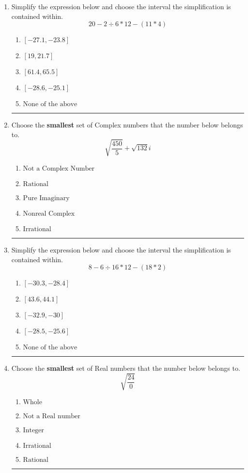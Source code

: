 \documentclass[14pt]{extbook}
\newcommand{\litem}[1]{\item#1\hspace*{-1cm}\rule{\textwidth}{0.4pt}}
\begin{document}
\begin{enumerate}
{\begin{enumerate}[label=\Alph*.]
\end{enumerate} }
\litem{
Simplify the expression below and choose the interval the simplification is contained within.\[ 20 - 2 \div 6 * 12 - (11 * 4) \]\begin{enumerate}[label=\Alph*.]
\item \( [-27.1, -23.8] \)
\item \( [19, 21.7] \)
\item \( [61.4, 65.5] \)
\item \( [-28.6, -25.1] \)
\item \( \text{None of the above} \)

\end{enumerate} }
\litem{
Choose the \textbf{smallest} set of Complex numbers that the number below belongs to.\[ \sqrt{\frac{450}{5}}+\sqrt{132} i \]\begin{enumerate}[label=\Alph*.]
\item \( \text{Not a Complex Number} \)
\item \( \text{Rational} \)
\item \( \text{Pure Imaginary} \)
\item \( \text{Nonreal Complex} \)
\item \( \text{Irrational} \)

\end{enumerate} }
\litem{
Simplify the expression below and choose the interval the simplification is contained within.\[ 8 - 6 \div 16 * 12 - (18 * 2) \]\begin{enumerate}[label=\Alph*.]
\item \( [-30.3, -28.4] \)
\item \( [43.6, 44.1] \)
\item \( [-32.9, -30] \)
\item \( [-28.5, -25.6] \)
\item \( \text{None of the above} \)

\end{enumerate} }
\litem{
Choose the \textbf{smallest} set of Real numbers that the number below belongs to.\[ \sqrt{\frac{24}{0}} \]\begin{enumerate}[label=\Alph*.]
\item \( \text{Whole} \)
\item \( \text{Not a Real number} \)
\item \( \text{Integer} \)
\item \( \text{Irrational} \)
\item \( \text{Rational} \)


\end{enumerate}}
\end{enumerate}
\end{document}
